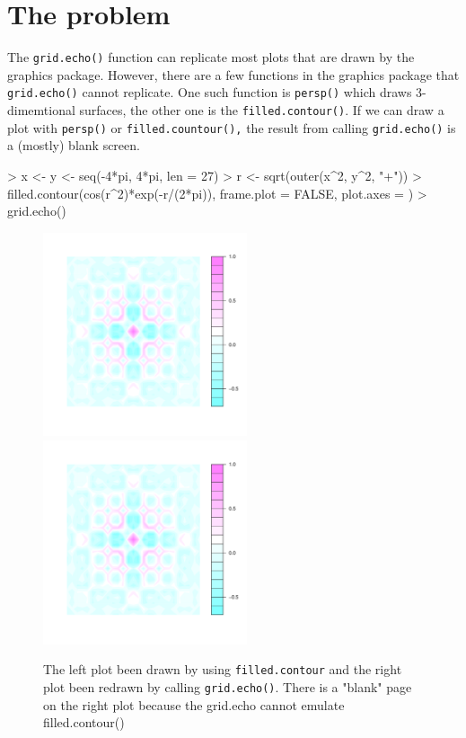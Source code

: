 \documentclass[paper=a4, fontsize=11pt]{report}
\begin{document}
\section{The problem}
The \texttt{grid.echo()} function can replicate most plots that are drawn by the graphics package. However, there are a few functions in the graphics package that \texttt{grid.echo()} cannot replicate. One such function is \texttt{persp()} which draws 3-dimemtional surfaces, the other one is the \texttt{filled.contour()}. If we can draw a plot with \texttt{persp()} or \texttt{filled.countour(),} the result from calling \texttt{grid.echo()} is a (mostly) blank screen. 
\begin{Schunk}
\begin{Sinput}
> x <- y <- seq(-4*pi, 4*pi, len = 27)
> r <- sqrt(outer(x^2, y^2, "+"))
> filled.contour(cos(r^2)*exp(-r/(2*pi)), frame.plot = FALSE, plot.axes = {})
> grid.echo()
\end{Sinput}
\end{Schunk}
\begin{figure}[h]
\begin{center}
  \includegraphics[height = 6cm, width = 6cm]{figure/report_fill_1}
  \includegraphics[height = 6cm, width = 6cm]{figure/report_fill_2}
  \caption{The left plot been drawn by using \texttt{filled.contour} and the right plot been redrawn by calling \texttt{grid.echo()}. There is a "blank" page on the right plot because the grid.echo cannot emulate filled.contour()}
  	\label{figure4}
\end{center}
\end{figure}
\end{document}
